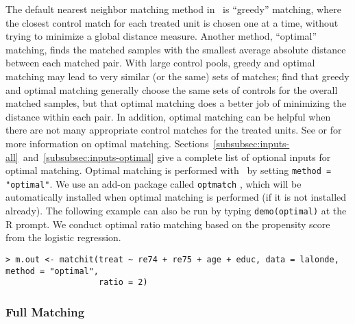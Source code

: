 The default nearest neighbor matching method in \MatchIt\ is
``greedy'' matching, where the closest control match for each treated
unit is chosen one at a time, without trying to minimize a global
distance measure.  Another method, ``optimal'' matching, finds the
matched samples with the smallest average absolute distance between
each matched pair.  With large control pools, greedy and optimal
matching may lead to very similar (or the same) sets of matches;
\citet{GuRos93} find that greedy and optimal matching generally choose
the same sets of controls for the overall matched samples, but that
optimal matching does a better job of minimizing the distance within
each pair.  In addition, optimal matching can be helpful when there
are not many appropriate control matches for the treated units.  See
\cite{GuRos93} or \cite{Rosenbaum02} for more information on optimal
matching.
Sections~\ref{subsubsec:inputs-all}~and~\ref{subsubsec:inputs-optimal}
give a complete list of optional inputs for optimal matching.  Optimal
matching is performed with \MatchIt\ by setting \texttt{method =
  "optimal"}.  We use an add-on package called \texttt{optmatch}
\citep{Hansen04}, which will be automatically installed when optimal
matching is performed (if it is not installed already).  The following
example can also be run by typing {\tt demo(optimal)} at the R prompt.
We conduct optimal ratio matching based on the propensity score from
the logistic regression.
\begin{verbatim}
> m.out <- matchit(treat ~ re74 + re75 + age + educ, data = lalonde, method = "optimal", 
                   ratio = 2)
\end{verbatim}

\subsubsection{Full Matching}
\label{subsubsec:full}

